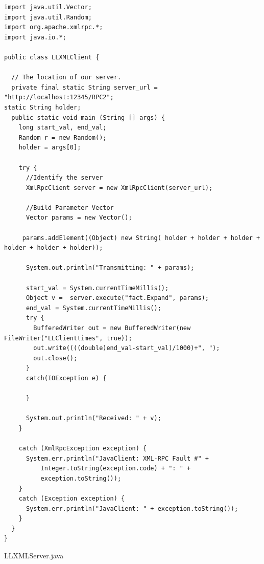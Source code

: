 \documentclass{article}
\begin{document}
\begin{lstlisting}
import java.util.Vector;
import java.util.Random;
import org.apache.xmlrpc.*;
import java.io.*;

public class LLXMLClient {

  // The location of our server.
  private final static String server_url = "http://localhost:12345/RPC2";
static String holder;
  public static void main (String [] args) {
    long start_val, end_val;
    Random r = new Random();
    holder = args[0];

    try {
      //Identify the server
      XmlRpcClient server = new XmlRpcClient(server_url);

      //Build Parameter Vector
      Vector params = new Vector();
      
     params.addElement((Object) new String( holder + holder + holder + holder + holder + holder));
    
      System.out.println("Transmitting: " + params);

      start_val = System.currentTimeMillis();
      Object v =  server.execute("fact.Expand", params);
      end_val = System.currentTimeMillis();
      try {
        BufferedWriter out = new BufferedWriter(new FileWriter("LLClienttimes", true));
        out.write((((double)end_val-start_val)/1000)+", ");
        out.close();
      }
      catch(IOException e) {

      }

      System.out.println("Received: " + v);
    }

    catch (XmlRpcException exception) {
      System.err.println("JavaClient: XML-RPC Fault #" +
          Integer.toString(exception.code) + ": " +
          exception.toString());
    }
    catch (Exception exception) {
      System.err.println("JavaClient: " + exception.toString());
    }
  }
}

\end{lstlisting}

LLXMLServer.java
\end{document}
